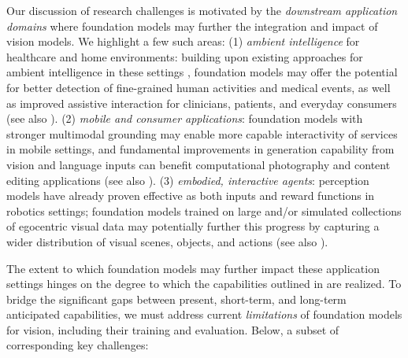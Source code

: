 Our discussion of research challenges is motivated by the \textit{downstream application domains} where foundation models may further the integration and impact of vision models. 
We highlight a few such areas:
(1) \textit{ambient intelligence} for healthcare and home environments: building upon existing approaches for ambient intelligence in these settings \cite{haque2017towards, lyytinen2002ubiquitous, hong2004architecture}, foundation models may offer the potential for better detection of fine-grained human activities and medical events, as well as improved assistive interaction for clinicians, patients, and everyday consumers (see also ).
(2) \textit{mobile and consumer applications}: foundation models with stronger multimodal grounding may enable more capable interactivity of services in mobile settings, and fundamental improvements in generation capability from vision and language inputs can benefit computational photography and content editing applications  \cite{delbracio2021mobile,ramesh2021zeroshot,park2019gaugan} (see also ).
(3) \textit{embodied, interactive agents}: perception models have already proven effective as both inputs  \cite{sermanet2018time} and reward functions  \cite{chen2021generalizable} in robotics settings; foundation models trained on large and/or simulated collections of egocentric visual data \cite{damen2018kitchens,chen2021geosim} may potentially further this progress by capturing a wider distribution of visual scenes, objects, and actions (see also ).

The extent to which foundation models may further impact these application settings hinges on the degree to which the capabilities outlined in  are realized. To bridge the significant gaps between present, short-term, and long-term anticipated capabilities, we must address current \textit{limitations} of foundation models for vision, including their training and evaluation. Below, a subset of corresponding key challenges:


